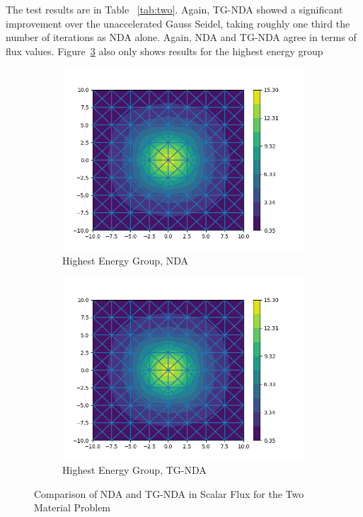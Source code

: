 The test results are in Table ~\ref{tab:two}. Again, TG-NDA showed a significant improvement over the unaccelerated Gauss Seidel, taking roughly one third the number of iterations as NDA alone. Again, NDA and TG-NDA agree in terms of flux values. Figure~\ref{fig:Moderator2} also only shows results for the highest energy group 
\begin{figure}[H]
\centering
\begin{subfigure}{.5\textwidth}
  \centering
  \includegraphics[width=\linewidth]{fig/nda_iron-water_scalar_flux_group0.png}
  \caption{Highest Energy Group, NDA}
  \label{fig:NDA-Mod2}
\end{subfigure}%
\begin{subfigure}{.5\textwidth}
  \centering
  \includegraphics[width=\linewidth]{fig/tgnda_iron-water_scalar_flux_group0.png}
  \caption{Highest Energy Group, TG-NDA}
  \label{fig:TG-NDA-Mod2}
\end{subfigure}
\caption{Comparison of NDA and TG-NDA in Scalar Flux for the Two Material Problem}
\label{fig:Moderator2}
\end{figure}

